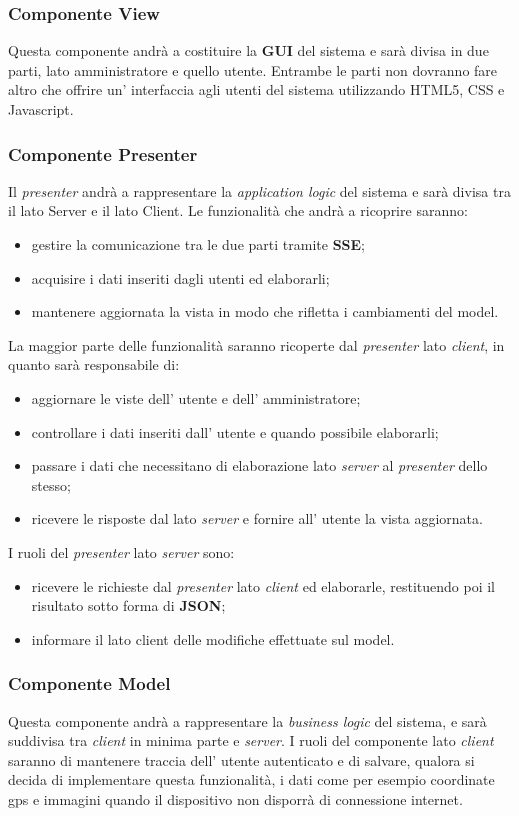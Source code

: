 \subsubsection{Componente View}
Questa componente andrà a costituire la \textbf{GUI} del sistema e sarà divisa in due parti, lato amministratore e quello utente. Entrambe le parti non dovranno fare altro che offrire un' interfaccia agli utenti del sistema utilizzando HTML5, CSS e Javascript.
\subsubsection{Componente Presenter}
Il \textit{presenter} andrà a rappresentare la \textit{application logic} del sistema e sarà divisa tra il lato Server e il lato Client. Le funzionalità che andrà a ricoprire saranno:
\begin{itemize}
	\item gestire la comunicazione tra le due parti tramite \textbf{SSE};
	\item acquisire i dati inseriti dagli utenti ed elaborarli;
	\item mantenere aggiornata la vista in modo che rifletta i cambiamenti del model.
\end{itemize}
La maggior parte delle funzionalità saranno ricoperte dal \textit{presenter} lato \textit{client}, in quanto sarà responsabile di:
\begin{itemize}
	\item aggiornare le viste dell' utente e dell' amministratore;
	\item controllare i dati inseriti dall' utente e quando possibile elaborarli;
	\item passare i dati che necessitano di elaborazione lato \textit{server} al \textit{presenter} dello stesso;
	\item ricevere le risposte dal lato \textit{server} e fornire all' utente la vista aggiornata.
\end{itemize}
I ruoli del \textit{presenter} lato \textit{server} sono:
\begin{itemize}
 \item ricevere le richieste dal \textit{presenter} lato \textit{client} ed elaborarle, restituendo poi il risultato sotto forma di \textbf{JSON};
 \item informare il lato client delle modifiche effettuate sul model.
\end{itemize}
\subsubsection{Componente Model}
Questa componente andrà a rappresentare la \textit{business logic} del sistema, e sarà suddivisa tra \textit{client} in minima parte e \textit{server}.
I ruoli del componente lato \textit{client} saranno di mantenere traccia dell' utente autenticato e di salvare, qualora si decida di implementare questa funzionalità, i dati come per esempio coordinate gps e immagini quando il dispositivo non disporrà di connessione internet.